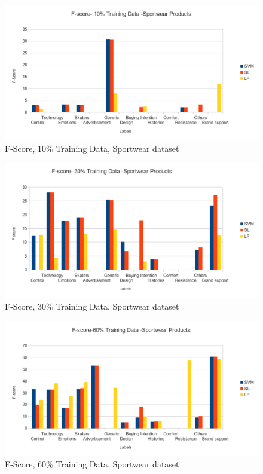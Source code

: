 \documentclass[4pt,a4paper,twocolumn]{article}
\begin{document}
{}






\begin{figure}[]
  
  \centering
    \includegraphics[scale=0.7]{graphics/sportWear/fscore-10-nike}
    \caption{F-Score, 10\% Training Data, Sportwear dataset}
   \label{fig:nike_10_fscore}  
\end{figure}

\begin{figure}[]
  
  \centering
    \includegraphics[scale=0.7]{graphics/sportWear/fscore-30-nike}
    \caption{F-Score, 30\% Training Data, Sportwear dataset}
   \label{fig:nike_30_fscore}  
\end{figure}


\begin{figure}[]
  
  \centering
    \includegraphics[scale=0.7]{graphics/sportWear/fscore-60-nike}
    \caption{F-Score, 60\% Training Data, Sportwear dataset}
   \label{fig:nike_60_fscore}  
\end{figure}
\end{document}
